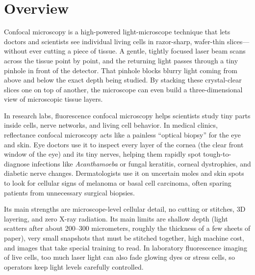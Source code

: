 \label{ch:infographic-confocal}

\section{Overview}

Confocal microscopy is a high-powered light-microscope technique that lets doctors and scientists see individual living cells in razor-sharp, wafer-thin slices---without ever cutting a piece of tissue. A gentle, tightly focused laser beam scans across the tissue point by point, and the returning light passes through a tiny pinhole in front of the detector. That pinhole blocks blurry light coming from above and below the exact depth being studied. By stacking these crystal-clear slices one on top of another, the microscope can even build a three-dimensional view of microscopic tissue layers.

In research labs, fluorescence confocal microscopy helps scientists study tiny parts inside cells, nerve networks, and living cell behavior. In medical clinics, reflectance confocal microscopy acts like a painless ``optical biopsy'' for the eye and skin. Eye doctors use it to inspect every layer of the cornea (the clear front window of the eye) and its tiny nerves, helping them rapidly spot tough-to-diagnose infections like \textit{Acanthamoeba} or fungal keratitis, corneal dystrophies, and diabetic nerve changes. Dermatologists use it on uncertain moles and skin spots to look for cellular signs of melanoma or basal cell carcinoma, often sparing patients from unnecessary surgical biopsies.

Its main strengths are microscope-level cellular detail, no cutting or stitches, 3D layering, and zero X-ray radiation. Its main limits are shallow depth (light scatters after about 200--300 micrometers, roughly the thickness of a few sheets of paper), very small snapshots that must be stitched together, high machine cost, and images that take special training to read. In laboratory fluorescence imaging of live cells, too much laser light can also fade glowing dyes or stress cells, so operators keep light levels carefully controlled.

